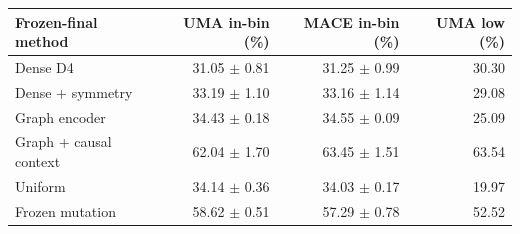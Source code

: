 \begin{center}\small
\begin{tabular}{lrrr}
\toprule
Frozen-final method & UMA in-bin (\%) & MACE in-bin (\%) & UMA low (\%)\\
\midrule
Dense D4 & 31.05 $\pm$ 0.81 & 31.25 $\pm$ 0.99 & 30.30\\
Dense + symmetry & 33.19 $\pm$ 1.10 & 33.16 $\pm$ 1.14 & 29.08\\
Graph encoder & 34.43 $\pm$ 0.18 & 34.55 $\pm$ 0.09 & 25.09\\
Graph + causal context & 62.04 $\pm$ 1.70 & 63.45 $\pm$ 1.51 & 63.54\\
Uniform & 34.14 $\pm$ 0.36 & 34.03 $\pm$ 0.17 & 19.97\\
Frozen mutation & 58.62 $\pm$ 0.51 & 57.29 $\pm$ 0.78 & 52.52\\
\bottomrule
\end{tabular}
\end{center}
